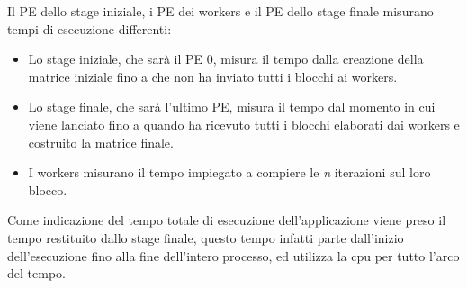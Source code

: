 Il PE dello stage iniziale, i PE dei workers e il PE dello stage finale misurano tempi di esecuzione differenti:
\begin{itemize}
  \item Lo stage iniziale, che sar\`a il PE 0, misura il tempo dalla creazione della matrice iniziale fino a che non ha inviato tutti i blocchi ai workers.
  \item Lo stage finale, che sar\`a l'ultimo PE, misura il tempo dal momento in cui viene lanciato fino a quando ha ricevuto tutti i blocchi elaborati dai workers e costruito la matrice finale.
  \item I workers misurano il tempo impiegato a compiere le \textit{n} iterazioni sul loro blocco.
\end{itemize}

Come indicazione del tempo totale di esecuzione dell'applicazione viene preso il tempo restituito dallo stage finale, questo tempo infatti parte dall'inizio dell'esecuzione fino alla fine dell'intero processo, ed utilizza la cpu per tutto l'arco del tempo.


